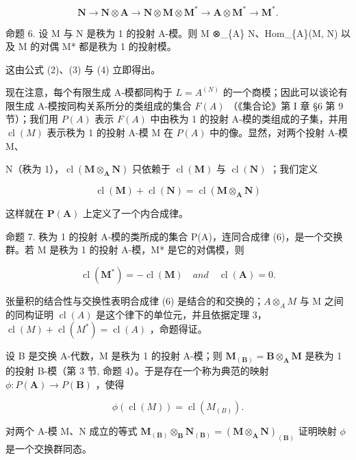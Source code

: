 \[
\mathbf {N} \rightarrow \mathbf {N} \otimes \mathbf {A} \rightarrow \mathbf {N} \otimes \mathbf {M} \otimes \mathbf {M} ^ {*} \rightarrow \mathbf {A} \otimes \mathbf {M} ^ {*} \rightarrow \mathbf {M} ^ {*}.
\]

命题 6. 设 M 与 N 是秩为 1 的投射 A-模。则 M ⊗\_\{A\} N、Hom\_\{A\}(M, N) 以及 M 的对偶 M* 都是秩为 1 的投射模。

这由公式 (2)、(3) 与 (4) 立即得出。

现在注意，每个有限生成 A-模都同构于 \(L = A^{(N)}\) 的一个商模；因此可以谈论有限生成 A-模按同构关系所分的类组成的集合 \(F(A)\) （《集合论》第 I 章 §6 第 9 节）；我们用 \(P(A)\) 表示 \(F(A)\) 中由秩为 1 的投射 A-模的类组成的子集，并用 \(\operatorname{cl}(M)\) 表示秩为 1 的投射 A-模 M 在 \(P(A)\) 中的像。显然，对两个投射 A-模 M、

N（秩为 1），\(\operatorname{cl}(\mathbf{M} \otimes_{\mathbf{A}} \mathbf{N})\) 只依赖于 \(\operatorname{cl}(\mathbf{M})\) 与 \(\operatorname{cl}(\mathbf{N})\) ；我们定义

\[
\operatorname{cl} (\mathbf {M}) + \operatorname{cl} (\mathbf {N}) = \operatorname{cl} (\mathbf {M} \otimes_ {\mathbf {A}} \mathbf {N})\tag{6}
\]

这样就在 \(\pmb{P}(\mathbf{A})\) 上定义了一个内合成律。

命题 7. 秩为 1 的投射 A-模的类所成的集合 P(A)，连同合成律 (6)，是一个交换群。若 M 是秩为 1 的投射 A-模，M* 是它的对偶模，则

\[
\operatorname{cl} (\mathbf {M} ^ {*}) = - \operatorname{cl} (\mathbf {M}) \quad a n d \quad \operatorname{cl} (\mathbf {A}) = 0.\tag{7}
\]

张量积的结合性与交换性表明合成律 (6) 是结合的和交换的；\(A \otimes_{A} M\) 与 M 之间的同构证明 \(\operatorname{cl}(A)\) 是这个律下的单位元，并且依据定理 3，\(\operatorname{cl}(M) + \operatorname{cl}(M^{*}) = \operatorname{cl}(A)\) ，命题得证。

设 B 是交换 A-代数，M 是秩为 1 的投射 A-模；则 \(\mathbf{M}_{(\mathbf{B})} = \mathbf{B} \otimes_{\mathbf{A}} \mathbf{M}\) 是秩为 1 的投射 B-模（第 3 节, 命题 4）。于是存在一个称为典范的映射 \(\phi: P(\mathbf{A}) \to P(\mathbf{B})\) ，使得

\[
\phi (\operatorname{cl} (M)) = \operatorname{cl} (M _ {(B)}).\tag{8}
\]

对两个 A-模 M、N 成立的等式 \(\mathbf{M}_{(\mathbf{B})}\otimes_{\mathbf{B}}\mathbf{N}_{(\mathbf{B})}=(\mathbf{M}\otimes_{\mathbf{A}}\mathbf{N})_{(\mathbf{B})}\) 证明映射 \(\phi\) 是一个交换群同态。


